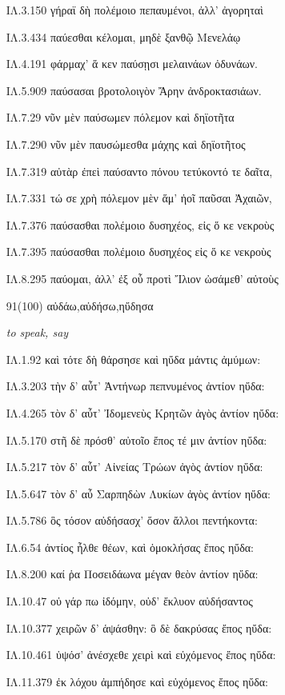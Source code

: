 \begin{enumerate}
{ΙΛ.3.150 γήραϊ δὴ πολέμοιο πεπαυμένοι, ἀλλ' ἀγορηταὶ 

ΙΛ.3.434 παύεσθαι κέλομαι, μηδὲ ξανθῷ Μενελάῳ 

ΙΛ.4.191 φάρμαχ' ἅ κεν παύσῃσι μελαινάων ὀδυνάων. 

ΙΛ.5.909 παύσασαι βροτολοιγὸν Ἄρην ἀνδροκτασιάων. 

ΙΛ.7.29 νῦν μὲν παύσωμεν πόλεμον καὶ δηϊοτῆτα 

ΙΛ.7.290 νῦν μὲν παυσώμεσθα μάχης καὶ δηϊοτῆτος 

ΙΛ.7.319 αὐτὰρ ἐπεὶ παύσαντο πόνου τετύκοντό τε δαῖτα, 

ΙΛ.7.331 τώ σε χρὴ πόλεμον μὲν ἅμ' ἠοῖ παῦσαι Ἀχαιῶν, 

ΙΛ.7.376 παύσασθαι πολέμοιο δυσηχέος, εἰς ὅ κε νεκροὺς 

ΙΛ.7.395 παύσασθαι πολέμοιο δυσηχέος εἰς ὅ κε νεκροὺς 

ΙΛ.8.295 παύομαι, ἀλλ' ἐξ οὗ προτὶ Ἴλιον ὠσάμεθ' αὐτοὺς 

}

\clearpage
\item[\large 91(100) ]{\large \g αὐδάω,αὐδήσω,ηὔδησα   }

\hspace{0.2cm} \textit{to speak, say }

{\g
ΙΛ.1.92 καὶ τότε δὴ θάρσησε καὶ ηὔδα μάντις ἀμύμων:

ΙΛ.3.203 τὴν δ' αὖτ' Ἀντήνωρ πεπνυμένος ἀντίον ηὔδα:

ΙΛ.4.265 τὸν δ' αὖτ' Ἰδομενεὺς Κρητῶν ἀγὸς ἀντίον ηὔδα:

ΙΛ.5.170 στῆ δὲ πρόσθ' αὐτοῖο ἔπος τέ μιν ἀντίον ηὔδα:

ΙΛ.5.217 τὸν δ' αὖτ' Αἰνείας Τρώων ἀγὸς ἀντίον ηὔδα:

ΙΛ.5.647 τὸν δ' αὖ Σαρπηδὼν Λυκίων ἀγὸς ἀντίον ηὔδα:

ΙΛ.5.786 ὃς τόσον αὐδήσασχ' ὅσον ἄλλοι πεντήκοντα:

ΙΛ.6.54 ἀντίος ἦλθε θέων, καὶ ὁμοκλήσας ἔπος ηὔδα:

ΙΛ.8.200 καί ῥα Ποσειδάωνα μέγαν θεὸν ἀντίον ηὔδα:

ΙΛ.10.47 οὐ γάρ πω ἰδόμην, οὐδ' ἔκλυον αὐδήσαντος

ΙΛ.10.377 χειρῶν δ' ἁψάσθην: ὃ δὲ δακρύσας ἔπος ηὔδα:

ΙΛ.10.461 ὑψόσ' ἀνέσχεθε χειρὶ καὶ εὐχόμενος ἔπος ηὔδα:

ΙΛ.11.379 ἐκ λόχου ἀμπήδησε καὶ εὐχόμενος ἔπος ηὔδα:

}
\end{enumerate}
